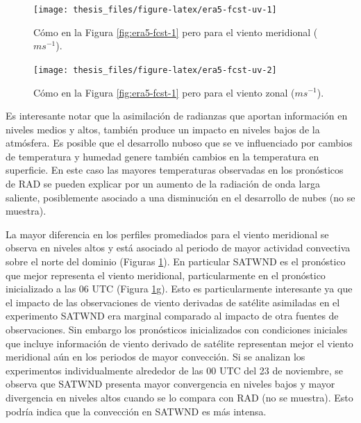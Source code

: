 \documentclass[12pt,oneside,a4paper]{reedthesis}
\begin{document}
\begin{figure}[ht]

{\centering \texttt{[image: thesis\_files/figure-latex/era5-fcst-uv-1]} 

}

\caption{Cómo en la Figura \ref{fig:era5-fcst-1} pero para el viento meridional (\(ms^{-1}\)).}\label{fig:era5-fcst-uv-1}
\end{figure}
\begin{figure}[ht]

{\centering \texttt{[image: thesis\_files/figure-latex/era5-fcst-uv-2]} 

}

\caption{Cómo en la Figura \ref{fig:era5-fcst-1} pero para el viento zonal (\(ms^{-1}\)).}\label{fig:era5-fcst-uv-2}
\end{figure}
Es interesante notar que la asimilación de radianzas que aportan información en niveles medios y altos, también produce un impacto en niveles bajos de la atmósfera. Es posible que el desarrollo nuboso que se ve influenciado por cambios de temperatura y humedad genere también cambios en la temperatura en superficie. En este caso las mayores temperaturas observadas en los pronósticos de RAD se pueden explicar por un aumento de la radiación de onda larga saliente, posiblemente asociado a una disminución en el desarrollo de nubes (no se muestra).

La mayor diferencia en los perfiles promediados para el viento meridional se observa en niveles altos y está asociado al periodo de mayor actividad convectiva sobre el norte del dominio (Figuras \ref{fig:era5-fcst-uv-1}). En particular SATWND es el pronóstico que mejor representa el viento meridional, particularmente en el pronóstico inicializado a las 06 UTC (Figura \ref{fig:era5-fcst-uv-1}g). Esto es particularmente interesante ya que el impacto de las observaciones de viento derivadas de satélite asimiladas en el experimento SATWND era marginal comparado al impacto de otra fuentes de observaciones. Sin embargo los pronósticos inicializados con condiciones iniciales que incluye información de viento derivado de satélite representan mejor el viento meridional aún en los periodos de mayor convección. Si se analizan los experimentos individualmente alrededor de las 00 UTC del 23 de noviembre, se observa que SATWND presenta mayor convergencia en niveles bajos y mayor divergencia en niveles altos cuando se lo compara con RAD (no se muestra). Esto podría indica que la convección en SATWND es más intensa.
\end{document}
